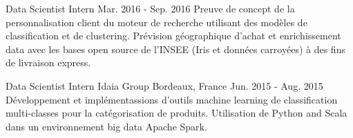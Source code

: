 \begin{cventries}
  \cventry
    {Data Scientist Intern} %
    {} %
    {} %
    {Mar. 2016 - Sep. 2016} %
    {
    Preuve de concept de la personnalisation client du moteur de recherche utilisant des modèles de classification et de clustering.\newline 
    Prévision géographique d'achat et enrichissement data avec les bases open source de l'INSEE (Iris et données carroyées) à des fins de livraison express.
    }

  \cventry
    {Data Scientist Intern} %
    {Idaia Group} %
    {Bordeaux, France} %
    {Jun. 2015 - Aug. 2015} %
    {
    Développement et implémentassions d'outils machine learning de classification multi-classes pour la catégorisation de produits.\newline
    Utilisation de Python and Scala dans un environnement big data Apache Spark.
    }
    
\end{cventries}
